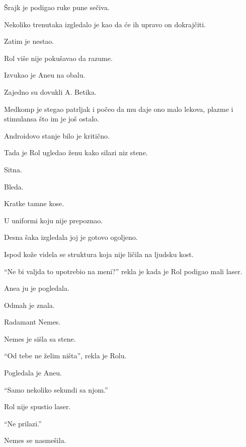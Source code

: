 \bigskip

Šrajk je podigao ruke pune sečiva.

Nekoliko trenutaka izgledalo je kao da će ih upravo on dokrajčiti.

\bigskip

Zatim je nestao.

\bigskip

Rol više nije pokušavao da razume.

Izvukao je Aneu na obalu.

Zajedno su dovukli A. Betika.

Medkomp je stegao patrljak i počeo da mu daje ono malo lekova, plazme i stimulansa što im je još ostalo.

\bigskip

Androidovo stanje bilo je kritično.

\bigskip

Tada je Rol ugledao ženu kako silazi niz stene.

\bigskip

Sitna.

Bleda.

Kratke tamne kose.

U uniformi koju nije prepoznao.

\bigskip

Desna šaka izgledala joj je gotovo ogoljeno.

Ispod kože videla se struktura koja nije ličila na ljudsku kost.

\bigskip

``Ne bi valjda to upotrebio na meni?'' rekla je kada je Rol podigao mali laser.

\bigskip

Anea ju je pogledala.

Odmah je znala.

\bigskip

Radamant Nemes.

\bigskip

Nemes je sišla sa stene.

``Od tebe ne želim ništa'', rekla je Rolu.

Pogledala je Aneu.

``Samo nekoliko sekundi sa njom.''

\bigskip

Rol nije spustio laser.

``Ne prilazi.''

\bigskip

Nemes se nasmešila.

